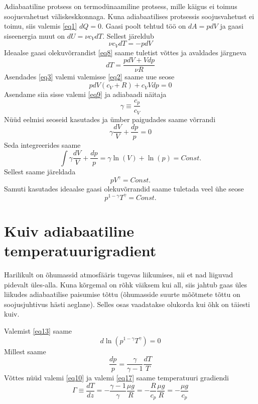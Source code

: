 \documentclass{trkut}%
\begin{document}
Adiabaatiline protsess on termodünaamiline protsess, mille käigus ei toimus soojusvahetust väliskeskkonnaga. Kuna adiabaatilises protsessis soojusvahetust ei toimu, siis valemis \ref{eq1} $dQ=0$. Gaasi poolt tehtud töö on $d A=pdV$ ja gaasi siseenergia muut on $dU=\nu c_VdT$. Sellest järeldub
\begin{equation}\label{eq2}
\nu c_VdT = -pdV
\end{equation}
Ideaalse gaasi olekuvõrrandist \ref{eq8} saame tuletist võttes ja avaldades järgneva
\begin{equation}\label{eq3}
dT = \frac{pdV+Vdp}{\nu R}
\end{equation}
Asendades \ref{eq3} valemi valemisse \ref{eq2} saame uue seose
\begin{equation}\label{eq4}
pdV(c_V+R)+c_VVdp=0
\end{equation}
Asendame siia sisse valemi \ref{eq9} ja adiabaadi näitaja
\begin{equation*}
\gamma \equiv \frac{c_p}{c_V}
\end{equation*}
Nüüd eelmisi seoseid kasutades ja ümber paigudades saame võrrandi
\begin{equation*}
\gamma \frac{dV}{V} + \frac{dp}{p} = 0
\end{equation*}
Seda integreerides saame
\begin{equation*}
 \int \gamma \frac{dV}{V} + \frac{dp}{p} = \gamma \ln(V) + \ln(p) = Const.
\end{equation*}
Sellest saame järeldada
\begin{equation*}
pV^\gamma = Const.
\end{equation*}
Samuti kasutades ideaalse gaasi olekuvõrrandid saame tuletada veel ühe seose
\begin{equation}\label{eq13}
p^{1-\gamma}T^\gamma = Const.
\end{equation}

\section{Kuiv adiabaatiline temperatuurigradient }
Harilikult on õhumassid atmosfääris tugevas liikumises, nii et nad liiguvad pidevalt üles-alla. Kuna kõrgemal on rõhk väiksem kui all, siis jahtub gaas üles liikudes adiabaatilise paisumise tõttu (õhumasside suurte mõõtmete tõttu on soojusjuhtivus hästi aeglane). Selles osas vaadatakse olukorda kui õhk on täiesti kuiv.

Valemist \ref{eq13} saame
\begin{equation*}
d\ln(p^{1-\gamma}T^\gamma) = 0
\end{equation*}
Millest saame
\begin{equation}\label{eq17}
\frac{dp}{p} = \frac{\gamma}{\gamma-1}\frac{dT}{T}
\end{equation}
Võttes nüüd valemi \ref{eq10} ja valemi \ref{eq17} saame temperatuuri gradiendi
\begin{equation}\label{eq11}
\Gamma \equiv \frac{dT}{dz}=-\frac{\gamma-1}{\gamma} \frac{\mu g}{R} = -\frac{R}{c_p}\frac{\mu g}{R} = -\frac{\mu g}{c_p}
\end{equation}
\end{document}
